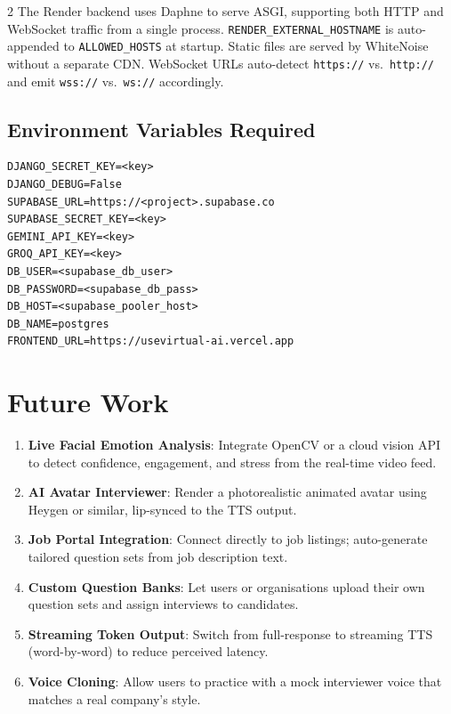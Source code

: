 \documentclass[10pt, a4paper]{article}
\begin{document}
\begin{multicols}{2}
The Render backend uses Daphne to serve ASGI, supporting both HTTP and
WebSocket traffic from a single process. \texttt{RENDER\_EXTERNAL\_HOSTNAME}
is auto-appended to \texttt{ALLOWED\_HOSTS} at startup. Static files are
served by WhiteNoise without a separate CDN. WebSocket URLs auto-detect
\texttt{https://} vs.\ \texttt{http://} and emit \texttt{wss://} vs.\
\texttt{ws://} accordingly.

\subsection{Environment Variables Required}
\begin{codebox}
\footnotesize
\begin{verbatim}
DJANGO_SECRET_KEY=<key>
DJANGO_DEBUG=False
SUPABASE_URL=https://<project>.supabase.co
SUPABASE_SECRET_KEY=<key>
GEMINI_API_KEY=<key>
GROQ_API_KEY=<key>
DB_USER=<supabase_db_user>
DB_PASSWORD=<supabase_db_pass>
DB_HOST=<supabase_pooler_host>
DB_NAME=postgres
FRONTEND_URL=https://usevirtual-ai.vercel.app
\end{verbatim}
\end{codebox}

\section{Future Work}

\begin{enumerate}
  \item \textbf{Live Facial Emotion Analysis}: Integrate OpenCV or a cloud
        vision API to detect confidence, engagement, and stress from the
        real-time video feed.
  \item \textbf{AI Avatar Interviewer}: Render a photorealistic animated
        avatar using Heygen or similar, lip-synced to the TTS output.
  \item \textbf{Job Portal Integration}: Connect directly to job listings;
        auto-generate tailored question sets from job description text.
  \item \textbf{Custom Question Banks}: Let users or organisations upload
        their own question sets and assign interviews to candidates.
  \item \textbf{Streaming Token Output}: Switch from full-response to
        streaming TTS (word-by-word) to reduce perceived latency.
  \item \textbf{Voice Cloning}: Allow users to practice with a mock
        interviewer voice that matches a real company's style.
\end{enumerate}


\end{multicols}
\end{document}
